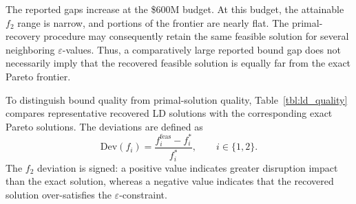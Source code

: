 \documentclass[preprint,11pt,authoryear]{elsarticle}
\begin{document}
The reported gaps increase at the \$600M budget. At this budget, the attainable $f_2$ range is
narrow, and portions of the frontier are nearly flat. The primal-recovery
procedure may consequently retain the same feasible solution for several
neighboring $\varepsilon$-values. Thus, a
comparatively large reported bound gap does not necessarily imply that the
recovered feasible solution is equally far from the exact Pareto frontier.

To distinguish bound quality from primal-solution quality,
Table~\ref{tbl:ld_quality} compares representative recovered LD solutions with
the corresponding exact Pareto solutions. The deviations are defined as
\[
\mathrm{Dev}(f_i)
=
\frac{f_i^{\mathrm{feas}}-f_i^*}{f_i^*},
\qquad i\in\{1,2\}.
\]
The $f_2$ deviation is signed: a positive value indicates greater disruption
impact than the exact solution, whereas a negative value indicates that the
recovered solution over-satisfies the $\varepsilon$-constraint.
\end{document}
